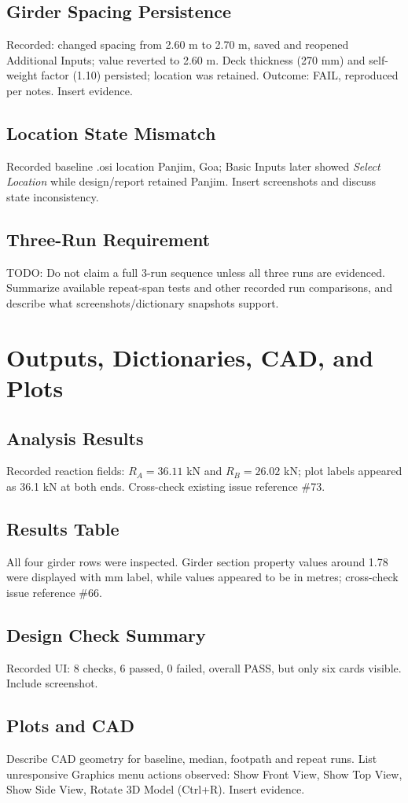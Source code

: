 \documentclass[11pt,a4paper]{report}
\begin{document}
\section{Girder Spacing Persistence}
Recorded: changed spacing from 2.60 m to 2.70 m, saved and reopened Additional Inputs; value reverted to 2.60 m. Deck thickness (270 mm) and self-weight factor (1.10) persisted; location was retained. Outcome: FAIL, reproduced per notes. Insert evidence.

\section{Location State Mismatch}
Recorded baseline .osi location Panjim, Goa; Basic Inputs later showed \textit{Select Location} while design/report retained Panjim. Insert screenshots and discuss state inconsistency.

\section{Three-Run Requirement}
TODO: Do not claim a full 3-run sequence unless all three runs are evidenced. Summarize available repeat-span tests and other recorded run comparisons, and describe what screenshots/dictionary snapshots support.

\chapter{Outputs, Dictionaries, CAD, and Plots}
\section{Analysis Results}
Recorded reaction fields: $R_A=36.11$ kN and $R_B=26.02$ kN; plot labels appeared as 36.1 kN at both ends. Cross-check existing issue reference \#73.
\section{Results Table}
All four girder rows were inspected. Girder section property values around 1.78 were displayed with mm label, while values appeared to be in metres; cross-check issue reference \#66.
\section{Design Check Summary}
Recorded UI: 8 checks, 6 passed, 0 failed, overall PASS, but only six cards visible. Include screenshot.
\section{Plots and CAD}
Describe CAD geometry for baseline, median, footpath and repeat runs. List unresponsive Graphics menu actions observed: Show Front View, Show Top View, Show Side View, Rotate 3D Model (Ctrl+R). Insert evidence.
\end{document}
